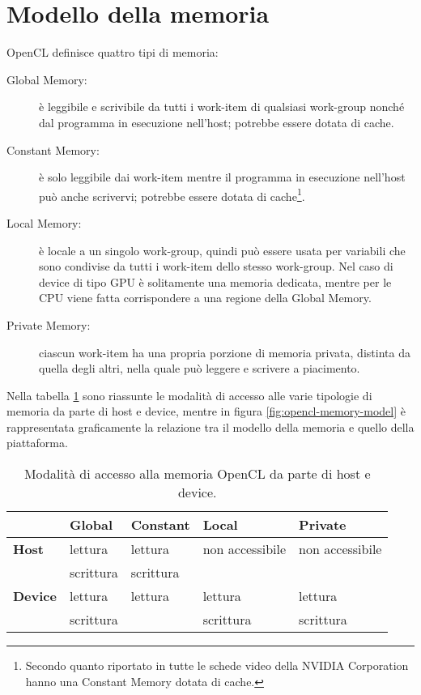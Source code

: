 \documentclass[12pt,a4paper,oneside]{book}
\begin{document}
\section{Modello della memoria}
\label{sec:opencl-memory}

\ac{OpenCL} definisce quattro tipi di memoria:
\begin{description}
\item[Global Memory:] è leggibile e scrivibile da tutti i work-item di qualsiasi work-group nonché dal programma in esecuzione nell'host; potrebbe essere dotata di cache.
\item[Constant Memory:] è solo leggibile dai work-item mentre il programma in esecuzione nell'host può anche scrivervi; potrebbe essere dotata di cache\footnote{Secondo quanto riportato in \cite{bib:nvidia} tutte le schede video della NVIDIA Corporation hanno una Constant Memory dotata di cache.}.
\item[Local Memory:] è locale a un singolo work-group, quindi può essere usata per variabili che sono condivise da tutti i work-item dello stesso work-group. Nel caso di device di tipo \ac{GPU} è solitamente una memoria dedicata, mentre per le \ac{CPU} viene fatta corrispondere a una regione della Global Memory.
\item[Private Memory:] ciascun work-item ha una propria porzione di memoria privata, distinta da quella degli altri, nella quale può leggere e scrivere a piacimento.
\end{description}

Nella tabella \ref{tab:opencl-memory-access} sono riassunte le modalità di accesso alle varie tipologie di memoria da parte di host e device, mentre in figura \ref{fig:opencl-memory-model} è rappresentata graficamente la relazione tra il modello della memoria e quello della piattaforma.

\begin{table}[p]
\begin{center}
\begin{tabular}{|l|l|l|l|l|}
\hline
 & \textbf{Global} &  \textbf{Constant} & \textbf{Local} & \textbf{Private} \\
\hline
\textbf{Host} & lettura   & lettura   & non accessibile & non accessibile \\
              & scrittura & scrittura &                 &                 \\
\hline
\textbf{Device} & lettura   & lettura & lettura   & lettura   \\
                & scrittura &         & scrittura & scrittura \\
\hline
\end{tabular}
\caption{Modalità di accesso alla memoria \ac{OpenCL} da parte di host e device.\label{tab:opencl-memory-access}}
\end{center}
\end{table}
\end{document}
